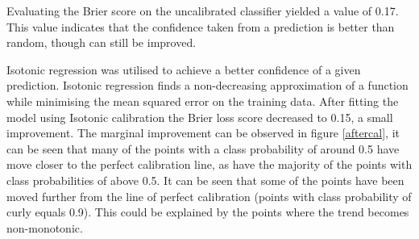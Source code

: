 \documentclass[12pt, a4paper]{article}
\begin{document}
	Evaluating the Brier score on the uncalibrated classifier yielded a value of 0.17. This value indicates that the confidence taken from a prediction is better than random, though can still be improved.

	Isotonic regression was utilised to achieve a better confidence of a given prediction. Isotonic regression finds a non-decreasing approximation of a
	function while minimising the mean squared error on the training data. After fitting the model using Isotonic calibration the Brier loss score decreased to 0.15, a small improvement. The marginal improvement can be observed in figure \ref{aftercal}, it can be seen that many of the points with a class probability of around 0.5 have move closer to the perfect
	calibration line, as have the majority of the points with class probabilities of above 0.5. It can be seen that some of the points have been moved further from the line
	of perfect calibration (points with class probability of curly equals 0.9). This could be explained by the points where the trend becomes non-monotonic.
\end{document}
